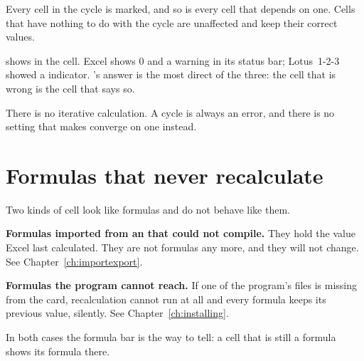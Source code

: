 Every cell in the cycle is marked, and so is every cell that depends on one.
Cells that have nothing to do with the cycle are unaffected and keep their
correct values.

\begin{ccnote}
\ccprod{} shows  in the cell. Excel shows 0 and a warning in its
status bar; Lotus~1-2-3 showed a  indicator. \ccprod's answer is the
most direct of the three: the cell that is wrong is the cell that says so.
\end{ccnote}

There is no iterative calculation. A cycle is always an error, and there is no
setting that makes \ccprod{} converge on one instead.

\section{Formulas that never recalculate}

Two kinds of cell look like formulas and do not behave like them.

\begin{ccsteps}
\item \textbf{Formulas imported from an  that \ccprod{} could not
compile.} They hold the value Excel last calculated. They are not formulas any
more, and they will not change. See Chapter~\ref{ch:importexport}.
\item \textbf{Formulas the program cannot reach.} If one of the program's files
is missing from the card, recalculation cannot run at all and every formula
keeps its previous value, silently. See Chapter~\ref{ch:installing}.
\end{ccsteps}

In both cases the formula bar is the way to tell: a cell that is still a formula
shows its formula there.
